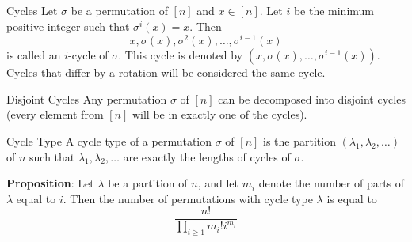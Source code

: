 \documentclass{report}
\begin{document}
\begin{definition}{Cycles}
    Let $\sigma$ be a permutation of $[n]$ and $x \in [n]$. Let $i$ be the minimum positive integer such that $\sigma^{i}(x) = x$. Then 
        \begin{equation*}
            x, \sigma(x), \sigma^{2}(x), \ldots , \sigma^{i - 1}(x)
        \end{equation*} 
    is called an $i$-cycle of $\sigma$. This cycle is denoted by $(x, \sigma(x), \ldots , \sigma^{i - 1}(x))$. Cycles that differ by a rotation will be considered the same cycle.
        \begin{center}
        \end{center}
\end{definition}

\begin{theorem}{Disjoint Cycles}
    Any permutation $\sigma$ of $[n]$ can be decomposed into disjoint cycles (every element from $[n]$ will be in exactly one of the cycles).
\end{theorem}

\begin{definition}{Cycle Type}
    A cycle type of a permutation $\sigma$ of $[n]$ is the partition $(\lambda_{1}, \lambda_{2}, \ldots )$ of $n$ such that $\lambda_{1}, \lambda_{2}, \ldots $ are exactly the lengths of cycles of $\sigma$.
\end{definition}

\textbf{Proposition}: Let $\lambda$ be a partition of $n$, and let $m_{i}$ denote the number of parts of $\lambda$ equal to $i$. Then the number of permutations with cycle type $\lambda$ is equal to 
    \begin{equation*}
        \dfrac{n!}{\prod_{i \geq 1}^{} m_{i}!i^{m_{i}}}
    \end{equation*}
\end{document}
